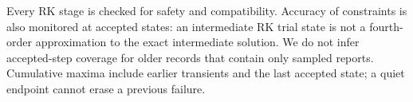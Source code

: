 Every RK stage is checked for safety and compatibility. Accuracy of constraints is also monitored at accepted states: an intermediate RK trial state is not a fourth-order approximation to the exact intermediate solution. We do not infer accepted-step coverage for older records that contain only sampled reports. Cumulative maxima include earlier transients and the last accepted state; a quiet endpoint cannot erase a previous failure.
